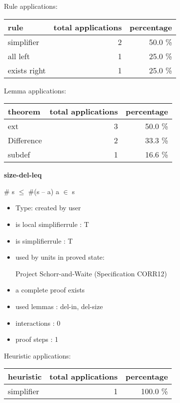 \documentclass[a4paper]{article}
\begin{document}
Rule applications:

\begin{supertabular}{l|r|r}
rule	        & total applications & percentage \\ \hline
simplifier & 2 & 50.0 \% \\
all left & 1 & 25.0 \% \\
exists right & 1 & 25.0 \% \\

\end{supertabular}

Lemma applications:

\begin{supertabular}{l|r|r}
theorem	        & total applications & percentage \\ \hline
ext & 3 & 50.0 \% \\
Difference & 2 & 33.3 \% \\
subdef & 1 & 16.6 \% \\

\end{supertabular}
\pagebreak

{\LARGE\bf size-del-leq}\label{lemma-size-del-leq}

\medskip

 \Fol \# s $\le$ \#(s -- a) \Equiv \Not a $\in$ s

\begin{itemize}

\item Type: created by user

\item is local simplifierrule : T
\item is simplifierrule : T
\item used by units in proved state:

Project Schorr-and-Waite (Specification CORR12)
\item       a complete proof exists
\item       used lemmas  : del-in, del-size
\item       interactions : 0
\item       proof steps  : 1
\end{itemize}

\medskip


Heuristic applications:

\begin{supertabular}{l|r|r}
heuristic	& total applications & percentage \\ \hline
simplifier & 1 & 100.0 \% \\

\end{supertabular}
\end{document}
